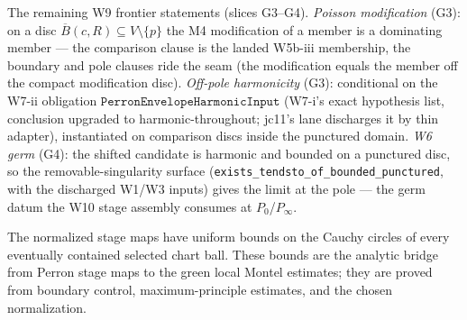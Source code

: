 \begin{lemma}
\label{lem:perron-greens-candidate-pole-profile}
The remaining W9 frontier statements (slices G3–G4).  \emph{Poisson
modification} (G3): on a disc \(\overline{B}(c, R) \subseteq V \setminus \{p\}\)
the M4 modification of a member is a dominating member — the comparison
clause is the landed W5b-iii membership, the boundary and pole clauses
ride the seam (the modification equals the member off the compact
modification disc).  \emph{Off-pole harmonicity} (G3): conditional on
the W7-ii obligation \(\texttt{PerronEnvelopeHarmonicInput}\) (W7-i's
exact hypothesis list, conclusion upgraded to harmonic-throughout;
jc11's lane discharges it by thin adapter), instantiated on comparison
discs inside the punctured domain.  \emph{W6 germ} (G4): the shifted
candidate is harmonic and bounded on a punctured disc, so the
removable-singularity surface
(\texttt{exists\_tendsto\_of\_bounded\_punctured}, with the discharged
W1/W3 inputs) gives the limit at the pole — the germ datum the W10
stage assembly consumes at \(P_0\)/\(P_\infty\).
\end{lemma}

\begin{lemma}
\label{lem:stage-chart-reading-uniform-cauchy-bound}
The normalized stage maps have uniform bounds on the Cauchy circles of every
eventually contained selected chart ball.  These bounds are the analytic
bridge from Perron stage maps to the green local Montel estimates; they are
proved from boundary control, maximum-principle estimates, and the chosen
normalization.
\end{lemma}

